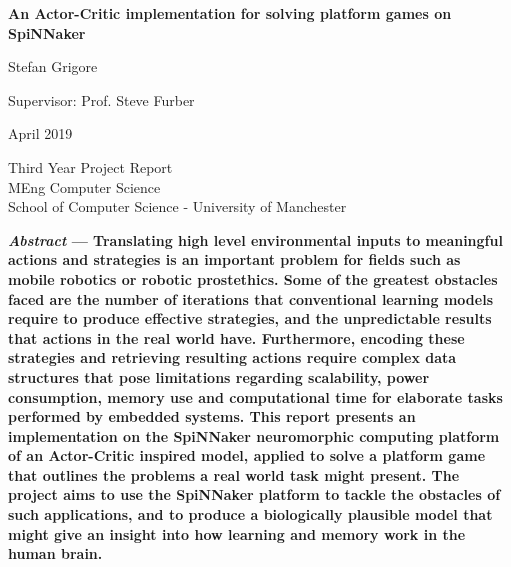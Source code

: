 \documentclass[10pt]{article}
\begin{document}
    
    \begin{titlepage}
        \begin{center}
        \vspace*{1cm}
    
        \Large
        \textbf{An Actor-Critic implementation for solving platform games on SpiNNaker}
    
        \vspace{0.5cm}
            Stefan Grigore
    
        \vspace{0.5cm} 
        
            Supervisor: Prof. Steve Furber

        \vspace{0.5cm} 

            April 2019
    
        \vspace{1.5cm}

        \vfill

        Third Year Project Report \\
        MEng Computer Science \\
        School of Computer Science - University of Manchester
     
        \end{center}
    \end{titlepage}

    \twocolumn
    
    \textbf{\textit{Abstract} --- Translating high level environmental inputs to meaningful actions and strategies is an important problem for fields such as mobile robotics or robotic prostethics. Some of the greatest obstacles faced are the number of iterations that conventional learning models require to produce effective strategies, and the unpredictable results that actions in the real world have. Furthermore, encoding these strategies and retrieving resulting actions require complex data structures that pose limitations regarding scalability, power consumption, memory use and computational time for elaborate tasks performed by embedded systems. This report presents an implementation on the SpiNNaker neuromorphic computing platform of an Actor-Critic inspired model, applied to solve a platform game that outlines the problems a real world task might present. The project aims to use the SpiNNaker platform to tackle the obstacles of such applications, and to produce a biologically plausible model that might give an insight into how learning and memory work in the human brain.}
\end{document}
